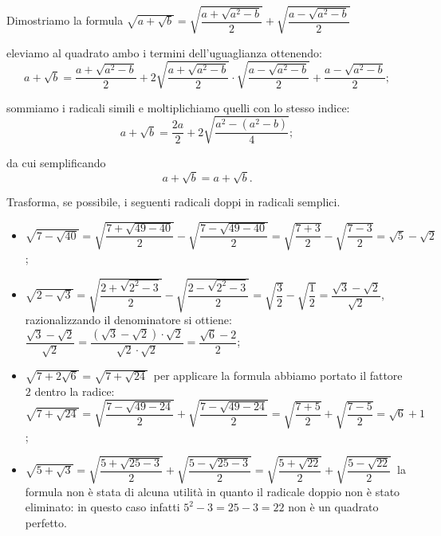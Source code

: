 Dimostriamo la formula $\sqrt{a+ \sqrt b}=\sqrt{\dfrac{a+\sqrt{a^2-b}} 2}+ \sqrt{\dfrac{a-\sqrt{a^2-b}} 2}$
\begin{itemize*}
\item eleviamo al quadrato ambo i termini dell'uguaglianza ottenendo:
\[a+ \sqrt b=\dfrac{a+\sqrt{a^2-b}}{2} +2\sqrt{\dfrac{a+\sqrt{a^2-b}}{2}}\cdot\sqrt{\dfrac{a-\sqrt{a^2-b}}{2}}+\dfrac{a-\sqrt{a^2-b}} 2;
\]
\item sommiamo i radicali simili e moltiplichiamo quelli con lo stesso indice:
\[a+ \sqrt b=\dfrac{2a}{2}+2\sqrt{\dfrac{a^{2}-\left(a^{2}-b\right)}{4}};
\]
\item da cui semplificando
\[a+ \sqrt b=a+ \sqrt b.\]
\end{itemize*}

\pagebreak
\begin{exrig}
 \begin{esempio}
Trasforma, se possibile, i seguenti radicali doppi in radicali semplici.
\begin{itemize}
 \item $\sqrt{7-\sqrt{40}}=\sqrt{\dfrac{7+\sqrt{49-40}} 2}-\sqrt{\dfrac{7-\sqrt{49-40}} 2}=\sqrt{\dfrac{7+3} 2}-\sqrt{\dfrac{7-3} 2}=\sqrt 5-\sqrt 2$;
 \item $\sqrt{2-\sqrt 3}=\sqrt{\dfrac{2+\sqrt{2^2-3}} 2}-\sqrt{\dfrac{2-\sqrt{2^2-3}} 2}=\sqrt{\dfrac 3 2}-\sqrt{\dfrac 1 2}=\dfrac{\sqrt 3-\sqrt 2}{\sqrt 2}$, razionalizzando il denominatore si ottiene: $\dfrac{\sqrt 3-\sqrt 2}{\sqrt 2}=\dfrac{(\sqrt 3-\sqrt 2)\cdot \sqrt 2}{\sqrt 2\cdot \sqrt 2}=\dfrac{\sqrt 6-2} 2$;
 \item $\sqrt{7+2\sqrt 6}=\sqrt{7+\sqrt{24}}$\, per applicare la formula abbiamo portato il fattore $2$ dentro la radice: $\sqrt{7+\sqrt{24}}=\sqrt{\dfrac{7-\sqrt{49-24}} 2}+\sqrt{\dfrac{7-\sqrt{49-24}} 2}=\sqrt{\dfrac{7+5} 2}+\sqrt{\dfrac{7-5} 2}=\sqrt 6+1$;
 \item $\sqrt{5+\sqrt 3}=\sqrt{\dfrac{5+\sqrt{25-3}} 2}+\sqrt{\dfrac{5-\sqrt{25-3}} 2}=\sqrt{\dfrac{5+\sqrt{22}} 2}+\sqrt{\dfrac{5-\sqrt{22}} 2}$\, la formula non è stata di alcuna utilità in quanto il radicale doppio non è stato eliminato: in questo caso infatti $5^2-3 = 25-3=22$ non è un quadrato perfetto.
\end{itemize}
 \end{esempio}
\end{exrig}
\vspazio\ovalbox{\risolvii \ref{ese:2.96}, \ref{ese:2.97}, \ref{ese:2.98}, \ref{ese:2.99}}

